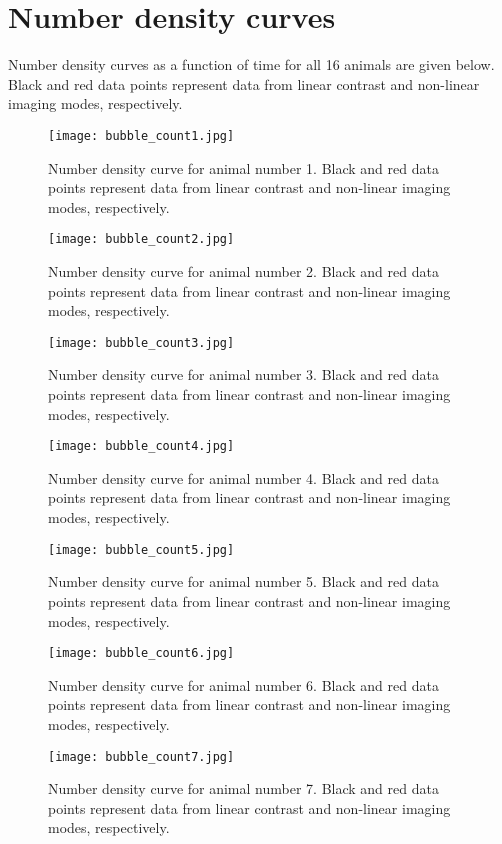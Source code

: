 \section{Number density curves}
\label{App:number_density_curves}
Number density curves as a function of time for all 16 animals are given below. Black and red data points represent data from linear contrast and non-linear imaging modes, respectively.

\begin{figure}
\texttt{[image: bubble\_count1.jpg]}
\caption{Number density curve for animal number 1. Black and red data points represent data from linear contrast and non-linear imaging modes, respectively.}
\end{figure}
\begin{figure}
\texttt{[image: bubble\_count2.jpg]}
\caption{Number density curve for animal number 2. Black and red data points represent data from linear contrast and non-linear imaging modes, respectively.}
\end{figure}
\begin{figure}
\texttt{[image: bubble\_count3.jpg]}
\caption{Number density curve for animal number 3. Black and red data points represent data from linear contrast and non-linear imaging modes, respectively.}
\end{figure}
\begin{figure}
\texttt{[image: bubble\_count4.jpg]}
\caption{Number density curve for animal number 4. Black and red data points represent data from linear contrast and non-linear imaging modes, respectively.}
\end{figure}
\begin{figure}
\texttt{[image: bubble\_count5.jpg]}
\caption{Number density curve for animal number 5. Black and red data points represent data from linear contrast and non-linear imaging modes, respectively.}
\end{figure}
\begin{figure}
\texttt{[image: bubble\_count6.jpg]}
\caption{Number density curve for animal number 6. Black and red data points represent data from linear contrast and non-linear imaging modes, respectively.}
\end{figure}
\begin{figure}
\texttt{[image: bubble\_count7.jpg]}
\caption{Number density curve for animal number 7. Black and red data points represent data from linear contrast and non-linear imaging modes, respectively.}
\end{figure}

